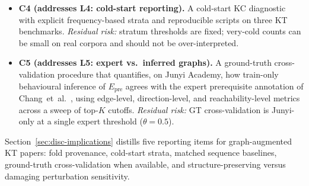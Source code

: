 \documentclass[preprint,10pt,doubleblind]{elsarticle}
\newcommand{\Epre}{\ensuremath{E_{\text{pre}}}}
\newcommand{\DDR}{\textsc{DDR}}
\begin{document}
\begin{itemize}
  $s_{m,D}$ is the \DDR{} slope of C2 and $\delta_{\theta}$ is the structural
  delta that pooling introduces at filter setting $\theta$
  (Section~\ref{sec:exposure}). Measuring $\delta_{\theta}$ by the weight mass
  that pooling moves, rather than by leaked edge count, both tightens the bound
  and explains the near-null result: opening the filter admits many leaked edges
  but little weight, so the channel is throttled by edge weight rather than by
  edge count. The four trained cells are scored in
  Table~\ref{tab:leakage-exposure}; remaining census cells were registered in
  advance (Supplementary Table~S25) rather than fitted after the fact.
  \emph{Residual risk:} the bound is informative only where it exceeds the
  training noise floor and where the reliance probe of C2 passes; on graph-inert
  backbones it collapses below resolution and makes no testable claim.
  $s_{m,D}$ is measured by edge \emph{removal} while pooling \emph{adds} edges,
  so the transfer between the two perturbation modes is assumed, not shown.
  \item \textbf{C4 (addresses L4: cold-start reporting).} A cold-start KC
  diagnostic with explicit frequency-based strata and reproducible scripts
  on three KT benchmarks.
  \emph{Residual risk:} stratum thresholds are fixed; very-cold counts can
  be small on real corpora and should not be over-interpreted.
  \item \textbf{C5 (addresses L5: expert vs.\ inferred graphs).} A
  ground-truth cross-validation procedure that quantifies, on Junyi
  Academy, how train-only behavioural inference of $\Epre$ agrees with the
  expert prerequisite annotation of Chang~et~al.~\cite{chang2015junyi},
  using edge-level, direction-level, and reachability-level metrics across
  a sweep of top-$K$ cutoffs.
  \emph{Residual risk:} GT cross-validation is Junyi-only at a single
  expert threshold ($\theta{=}0.5$).
\end{itemize}
Section~\ref{sec:disc-implications} distills five reporting items for
graph-augmented KT papers: fold provenance, cold-start strata, matched sequence
baselines, ground-truth cross-validation when available, and
structure-preserving versus damaging perturbation sensitivity.
\end{document}
